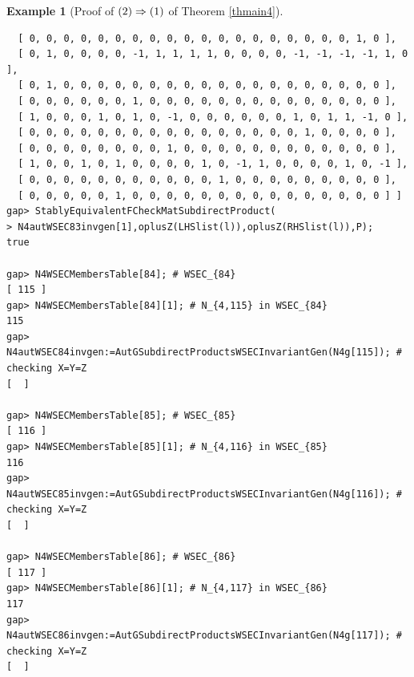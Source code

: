 \documentclass{amsart}
\theoremstyle{plain}
\theoremstyle{definition}
\newtheorem{example}[theorem]{Example}
\theoremstyle{remark}
\begin{document}
\begin{example}[Proof of ${\rm (2)}\Rightarrow {\rm (1)}$ of {Theorem \ref{thmain4}}]
\begin{verbatim}
  [ 0, 0, 0, 0, 0, 0, 0, 0, 0, 0, 0, 0, 0, 0, 0, 0, 0, 0, 0, 1, 0 ], 
  [ 0, 1, 0, 0, 0, 0, -1, 1, 1, 1, 1, 0, 0, 0, 0, -1, -1, -1, -1, 1, 0 ], 
  [ 0, 1, 0, 0, 0, 0, 0, 0, 0, 0, 0, 0, 0, 0, 0, 0, 0, 0, 0, 0, 0 ], 
  [ 0, 0, 0, 0, 0, 0, 1, 0, 0, 0, 0, 0, 0, 0, 0, 0, 0, 0, 0, 0, 0 ], 
  [ 1, 0, 0, 0, 1, 0, 1, 0, -1, 0, 0, 0, 0, 0, 0, 1, 0, 1, 1, -1, 0 ], 
  [ 0, 0, 0, 0, 0, 0, 0, 0, 0, 0, 0, 0, 0, 0, 0, 0, 1, 0, 0, 0, 0 ], 
  [ 0, 0, 0, 0, 0, 0, 0, 0, 1, 0, 0, 0, 0, 0, 0, 0, 0, 0, 0, 0, 0 ], 
  [ 1, 0, 0, 1, 0, 1, 0, 0, 0, 0, 1, 0, -1, 1, 0, 0, 0, 0, 1, 0, -1 ], 
  [ 0, 0, 0, 0, 0, 0, 0, 0, 0, 0, 0, 1, 0, 0, 0, 0, 0, 0, 0, 0, 0 ], 
  [ 0, 0, 0, 0, 0, 1, 0, 0, 0, 0, 0, 0, 0, 0, 0, 0, 0, 0, 0, 0, 0 ] ]
gap> StablyEquivalentFCheckMatSubdirectProduct(
> N4autWSEC83invgen[1],oplusZ(LHSlist(l)),oplusZ(RHSlist(l)),P);
true

gap> N4WSECMembersTable[84]; # WSEC_{84}
[ 115 ]
gap> N4WSECMembersTable[84][1]; # N_{4,115} in WSEC_{84}
115
gap> N4autWSEC84invgen:=AutGSubdirectProductsWSECInvariantGen(N4g[115]); # checking X=Y=Z
[  ]

gap> N4WSECMembersTable[85]; # WSEC_{85}
[ 116 ]
gap> N4WSECMembersTable[85][1]; # N_{4,116} in WSEC_{85}
116
gap> N4autWSEC85invgen:=AutGSubdirectProductsWSECInvariantGen(N4g[116]); # checking X=Y=Z
[  ]

gap> N4WSECMembersTable[86]; # WSEC_{86}
[ 117 ]
gap> N4WSECMembersTable[86][1]; # N_{4,117} in WSEC_{86}
117
gap> N4autWSEC86invgen:=AutGSubdirectProductsWSECInvariantGen(N4g[117]); # checking X=Y=Z
[  ]


\end{verbatim}
\end{example}
\end{document}
